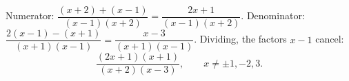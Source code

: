 Numerator: $\dfrac{(x+2)+(x-1)}{(x-1)(x+2)}=\dfrac{2x+1}{(x-1)(x+2)}$. Denominator: $\dfrac{2(x-1)-(x+1)}{(x+1)(x-1)}=\dfrac{x-3}{(x+1)(x-1)}$. Dividing, the factors $x-1$ cancel:
\[\boxed{\dfrac{(2x+1)(x+1)}{(x+2)(x-3)}},\qquad x\ne\pm1,-2,3.\]
